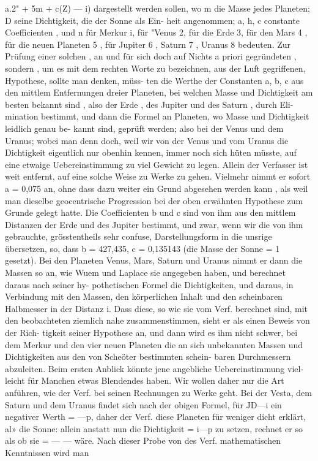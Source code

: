 \documentclass[12pt,a4paper]{article}
\begin{document}
a.2"  +  5m  +  c(Z)  --- i) dargestellt  werden  sollen,  wo  m  die  Masse  jedes  Planeten;  D  seine  Dichtigkeit,  die  der  Sonne  als  Ein- heit angenommen;    a,  h,  c   constante   Coefficienten ,    und  n  für  Merkur  i,   für  "Venus  2,    für  die  Erde  3, für  den  Mars  4 ,  für  die  neuen  Planeten  5 ,  für  Jupiter  6 ,  Saturn  7 ,  Uranus  8  bedeuten. Zur  Prüfung  einer  solchen ,  an  und  für  sich  doch  auf  Nichts  a  priori  gegründeten ,  sondern ,  um es  mit  dem  rechten  Worte  zu  bezeichnen,  aus  der  Luft  gegriffenen,  Hypothese,  sollte  man  denken,  müss- ten  die  Werthe  der  Constanten  a,  b,  c  aus  den  mittlem  Entfernungen  dreier  Planeten,  bei  welchen Masse  und  Dichtigkeit  am  besten  bekannt  sind ,  also  der  Erde ,  des  Jupiter  und  des  Saturn ,  durch  Eli- mination bestimmt,  und  dann  die  Formel  an  Planeten,  wo  Masse  und  Dichtigkeit  leidlich  genau  be- kannt sind,  geprüft  werden;  also  bei  der  Venus  und  dem  Uranus;  wobei  man  denn  doch,  weil  wir  von der  Venus  und  vom  Uranus  die  Dichtigkeit  eigentlich  nur  obenhin  kennen,  immer  noch  sich  hüten müsste,  auf  eine  etwaige  Uebereinstimmung  zu  viel  Gewicht  zu  legen.  Allein  der  Verfasser  ist  weit entfernt,  auf  eine  solche  Weise  zu  Werke  zu  gehen.  Vielmehr  nimmt  er  sofort  a  =  0,075  an,  ohne  dass dazu  weiter  ein  Grund  abgesehen  werden  kann ,  als  weil  man  dieselbe  geocentrische  Progression  bei  der oben  erwähnten  Hypothese  zum  Grunde  gelegt  hatte.  Die  Coefficienten  b  und  c  sind  von  ihm  aus  den mittlem  Distanzen  der  Erde  und  des  Jupiter  bestimmt,  und  zwar,  wenn  wir  die  von  ihm  gebrauchte, grösstentheils  sehr  confuse,  Darstellungsform  in  die  unsrige  übersetzen,  so,  dass  b  =  427,435,  c  =  0,135143 (die  Masse  der  Sonne  =  1  gesetzt).  Bei  den  Planeten  Venus,  Mars,  Saturn  und  Uranus  nimmt  er  dann die  Massen  so  an,  wie  Wuem  und  Laplace  sie  angegeben  haben,  und  berechnet  daraus  nach  seiner  hy- pothetischen Formel  die  Dichtigkeiten,  und  daraus,  in  Verbindung  mit  den  Massen,  den  körperlichen Inhalt  und  den  scheinbaren  Halbmesser  in  der  Distanz  i.  Dass  diese,  so  wie  sie  vom  Verf.  berechnet sind,  mit  den  beobachteten  ziemlich  nahe  zusammenstimmen,  sieht  er  als  einen  Beweis  von  der  Rich- tigkeit seiner  Hypothese  an,  und  dann  wird  es  ihm  nicht  schwer,  bei  dem  Merkur  und  den  vier  neuen Planeten  die  an  sich  unbekannten  Massen  und  Dichtigkeiten  aus  den  von  Scheöter  bestimmten  schein- baren Durchmessern  abzuleiten.  Beim  ersten  Anblick  könnte  jene  angebliche  Uebereinstimmung  viel- leicht für  Manchen  etwas  Blendendes  haben.  Wir  wollen  daher  nur  die  Art  anführen,  wie  der  Verf. bei  seinen  Rechnungen  zu  Werke  geht.  Bei  der  Vesta,  dem  Saturn  und  dem  Uranus  findet  sich  nach der  obigen  Formel,  für  JD---i  ein  negativer  Werth  =  ---p,  daher  der  Verf.  diese  Planeten  für  weniger dicht  erklärt,  al»  die  Sonne:    allein  anstatt  nun  die  Dichtigkeit    =  i---p   zu  setzen,  rechnet  er  so    als ob  sie    =   --- ---    wäre.     Nach  dieser  Probe  von  des  Verf.  mathematischen  Kenntnissen  wird  man  
\end{document}
